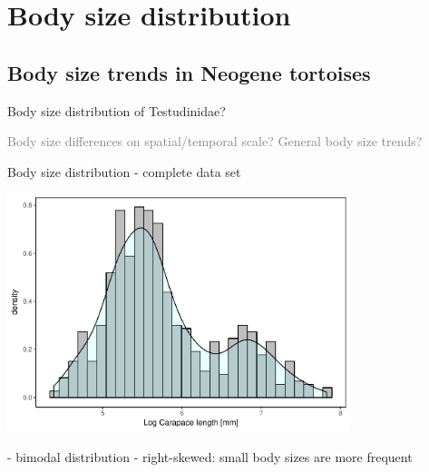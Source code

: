 \section{Body size distribution}


\subsection{Body size trends in Neogene tortoises}

\begin{frame}
\begin{enumerate}
\p Body size distribution of Testudinidae?
\bigskip

\p \textcolor{gray}{
 Body size differences on spatial/temporal scale? 
\bigskip
\p General body size trends? }
\end{enumerate}
\end{frame}


\begin{frame}{Body size distribution - complete data set}
\begin{center}
	\includegraphics[width=0.75\textwidth]{MA_JJ_files/figure-latex/HistAll-1.pdf}
\end{center}

- bimodal distribution
- right-skewed: small body sizes are more frequent
\end{frame}


